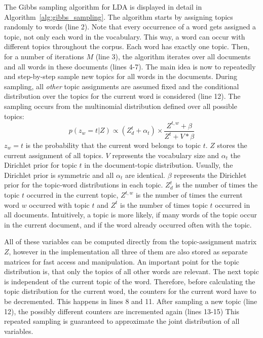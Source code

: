 \documentclass[
        a4paper,
        titlepage,
        twoside,
        parskip
        ]{scrbook}
\theoremstyle{break}
\begin{document}
The Gibbs sampling algorithm for LDA is displayed in detail in Algorithm~\ref{alg:gibbs_sampling}.
The algorithm starts by assigning topics randomly to words (line 2).
Note that every occurrence of a word gets assigned a topic, not only each word in the vocabulary.
This way, a word can occur with different topics throughout the corpus.
Each word has exactly one topic.
Then, for a number of iterations $M$ (line 3), the algorithm iterates over all documents and all words in these documents (lines 4-7).
The main idea is now to repeatedly and step-by-step sample new topics for all words in the documents.
During sampling, all \emph{other} topic assignments are assumed fixed and the conditional distribution over the topics for the current word is considered (line 12).
The sampling occurs from the multinomial distribution defined over all possible topics:
\begin{equation*}
  p(z_w = t | Z) \propto (Z_{d}^{t} + \alpha_t) \times  \frac{Z^{t, w} + \beta}{Z^{t} + V * \beta}
\end{equation*}
$z_w = t$ is the probability that the current word belongs to topic $t$.
$Z$ stores the current assignment of all topics.
$V$ represents the vocabulary size and $\alpha_t$ the Dirichlet prior for topic $t$ in the document-topic distribution.
Usually, the Dirichlet prior is symmetric and all $\alpha_t$ are identical.
$\beta$ represents the Dirichlet prior for the topic-word distributions in each topic.
$Z_{d}^{t}$ is the number of times the topic $t$ occurred in the current topic, $Z^{t, w}$ is the number of times the current word $w$ occurred with topic $t$ and $Z^t$ is the number of times topic $t$ occurred in all documents.
Intuitively, a topic is more likely, if many words of the topic occur in the current document, and if the word already occurred often with the topic.

All of these variables can be computed directly from the topic-assignment matrix $Z$, however in the implementation all three of them are also stored as separate matrices for fast access and manipulation.
An important point for the topic distribution is, that only the topics of all other words are relevant.
The next topic is independent of the current topic of the word.
Therefore, before calculating the topic distribution for the current word, the counters for the current word have to be decremented.
This happens in lines 8 and 11.
After sampling a new topic (line 12), the possibly different counters are incremented again (lines 13-15)
This repeated sampling is guaranteed to approximate the joint distribution of all variables.
\end{document}

